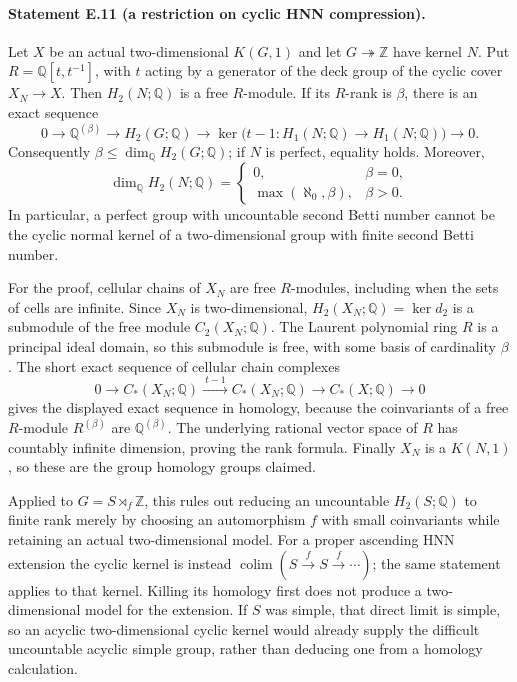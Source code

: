 \paragraph{Statement E.11 (a restriction on cyclic HNN compression).}
Let $X$ be an actual two-dimensional $K(G,1)$ and
let $G\twoheadrightarrow\mathbb Z$ have kernel $N$.
Put $R=\mathbb Q[t,t^{-1}]$, with $t$ acting by a
generator of the deck group of the cyclic cover
$X_N\to X$. Then $H_2(N;\mathbb Q)$ is a free
$R$-module. If its $R$-rank is $\beta$, there is an
exact sequence
\[
 0\longrightarrow\mathbb Q^{(\beta)}
 \longrightarrow H_2(G;\mathbb Q)
 \longrightarrow
 \ker\bigl(t-1:H_1(N;\mathbb Q)\to H_1(N;\mathbb Q)\bigr)
 \longrightarrow0.
\]
Consequently $\beta\leq\dim_{\mathbb Q}H_2(G;\mathbb Q)$;
if $N$ is perfect, equality holds. Moreover,
\[
 \dim_{\mathbb Q}H_2(N;\mathbb Q)=
 \begin{cases}
 0,&\beta=0,\\
 \max(\aleph_0,\beta),&\beta>0.
 \end{cases}
\]
In particular, a perfect group with uncountable
second Betti number cannot be the cyclic normal
kernel of a two-dimensional group with finite
second Betti number.

For the proof, cellular chains of $X_N$ are free
$R$-modules, including when the sets of cells
are infinite. Since $X_N$ is two-dimensional,
$H_2(X_N;\mathbb Q)=\ker d_2$ is a submodule
of the free module $C_2(X_N;\mathbb Q)$.
The Laurent polynomial ring $R$ is a principal
ideal domain, so this submodule is free, with
some basis of cardinality $\beta$. The short
exact sequence of cellular chain complexes
\[
 0\longrightarrow C_*(X_N;\mathbb Q)
 \xrightarrow{\ t-1\ }C_*(X_N;\mathbb Q)
 \longrightarrow C_*(X;\mathbb Q)\longrightarrow0
\]
gives the displayed exact sequence in homology,
because the coinvariants of a free $R$-module
$R^{(\beta)}$ are $\mathbb Q^{(\beta)}$.
The underlying rational vector space of $R$ has
countably infinite dimension, proving the rank
formula. Finally $X_N$ is a $K(N,1)$, so these
are the group homology groups claimed.

Applied to $G=S\rtimes_f\mathbb Z$, this rules
out reducing an uncountable $H_2(S;\mathbb Q)$
to finite rank merely by choosing an automorphism
$f$ with small coinvariants while retaining an
actual two-dimensional model. For a proper
ascending HNN extension the cyclic kernel is
instead $\operatorname*{colim}(S\xrightarrow fS
\xrightarrow f\cdots)$; the same statement applies
to that kernel. Killing its homology first does
not produce a two-dimensional model for the
extension. If $S$ was simple, that direct limit
is simple, so an acyclic two-dimensional cyclic
kernel would already supply the difficult
uncountable acyclic simple group, rather than
deducing one from a homology calculation.

